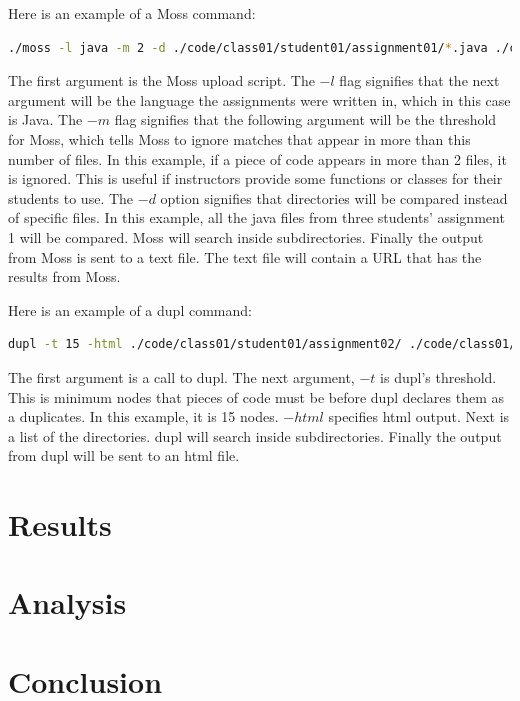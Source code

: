 \documentclass[12pt]{article}
\begin{document}
			Here is an example of a Moss command:
			\begin{lstlisting}[language=bash, breaklines=true]
./moss -l java -m 2 -d ./code/class01/student01/assignment01/*.java ./code/class01/student02/assignment01/*.java ./code/class01/student03/assignment01/*.java > assignment01.txt &
			\end{lstlisting}
			\noindent The first argument is the Moss upload script. The $-l$ flag signifies that the next argument will be the language the assignments were written in, which in this case is Java. The $-m$ flag signifies that the following argument will be the threshold for Moss, which tells Moss to ignore matches that appear in more than this number of files. In this example, if a piece of code appears in more than 2 files, it is ignored. This is useful if instructors provide some functions or classes for their students to use. The $-d$ option signifies that directories will be compared instead of specific files. In this example, all the java files from three students' assignment 1 will be compared. Moss will search inside subdirectories. Finally the output from Moss is sent to a text file. The text file will contain a URL that has the results from Moss.
			
			Here is an example of a dupl command:
			\begin{lstlisting}[language=bash, breaklines=true]
dupl -t 15 -html ./code/class01/student01/assignment02/ ./code/class01/student02/assignment02/ ./code/class01/student03/assignment02/ > assignment02.html &
			\end{lstlisting}
			\noindent The first argument is a call to dupl. The next argument, $-t$ is dupl's threshold. This is minimum nodes that pieces of code must be before dupl declares them as a duplicates. In this example, it is 15 nodes. $-html$ specifies html output. Next is a list of the directories. dupl will search inside subdirectories. Finally the output from dupl will be sent to an html file.
			
	\section{Results}
	\section{Analysis}
	\section{Conclusion}
	
	
\end{document}
